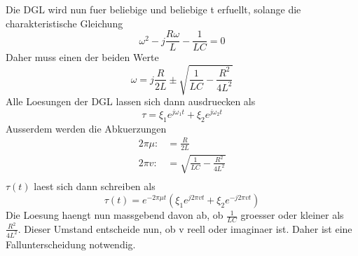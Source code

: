 \documentclass[titlepage=firstcover, captions=tableheading]{scrartcl}
\begin{document}
Die DGL wird nun fuer beliebige \xi und beliebige t erfuellt, solange \omega die charakteristische Gleichung 
\begin{equation}
    \omega^2-j\frac{R\omega}{L}-\frac{1}{LC}=0 \nonumber
\end{equation}
Daher muss \omega einen der beiden Werte 
\begin{equation}
    \omega=j\frac{R}{2L}\pm \sqrt{\frac{1}{LC}-\frac{R^2}{4L^2}}\nonumber
\end{equation}
Alle Loesungen der DGL lassen sich dann ausdruecken als 
\begin{equation}
    \tau=\xi_1e^{j\omega_1t}+\xi_2e^{j\omega_2t}\nonumber
\end{equation}
Ausserdem werden die Abkuerzungen 
\begin{align}\label{Reff}
    2\pi\mu:&=\frac{R}{2L}\\
    2\pi v:&=\sqrt{\frac{1}{LC}-\frac{R^2}{4L^2}}\nonumber\\
\end{align}
$\tau(t)$ laest sich dann schreiben als
\begin{equation}\label{Klammer}
    \tau(t)=e^{-2\pi\mu t}(\xi_1e^{j2\pi vt}+\xi_2e^{-j2\pi vt})
\end{equation}
Die Loesung haengt nun massgebend davon ab, ob $\frac{1}{LC}$ groesser oder kleiner als $\frac{R^2}{4L^2}$. Dieser Umstand entscheide nun, ob v reell oder imaginaer ist. Daher ist eine Fallunterscheidung notwendig.
\end{document}
